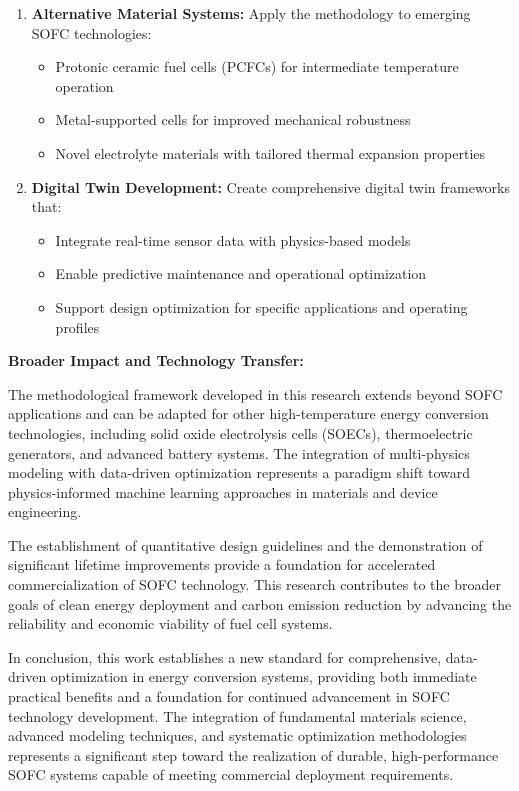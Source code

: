 \documentclass[conference]{IEEEtran}
\begin{document}
\begin{enumerate}
\item \textbf{Alternative Material Systems:} Apply the methodology to emerging SOFC technologies:
   \begin{itemize}
   \item Protonic ceramic fuel cells (PCFCs) for intermediate temperature operation
   \item Metal-supported cells for improved mechanical robustness
   \item Novel electrolyte materials with tailored thermal expansion properties
   \end{itemize}

\item \textbf{Digital Twin Development:} Create comprehensive digital twin frameworks that:
   \begin{itemize}
   \item Integrate real-time sensor data with physics-based models
   \item Enable predictive maintenance and operational optimization
   \item Support design optimization for specific applications and operating profiles
   \end{itemize}
\end{enumerate}

\textbf{Broader Impact and Technology Transfer:}

The methodological framework developed in this research extends beyond SOFC applications and can be adapted for other high-temperature energy conversion technologies, including solid oxide electrolysis cells (SOECs), thermoelectric generators, and advanced battery systems. The integration of multi-physics modeling with data-driven optimization represents a paradigm shift toward physics-informed machine learning approaches in materials and device engineering.

The establishment of quantitative design guidelines and the demonstration of significant lifetime improvements provide a foundation for accelerated commercialization of SOFC technology. This research contributes to the broader goals of clean energy deployment and carbon emission reduction by advancing the reliability and economic viability of fuel cell systems.

In conclusion, this work establishes a new standard for comprehensive, data-driven optimization in energy conversion systems, providing both immediate practical benefits and a foundation for continued advancement in SOFC technology development. The integration of fundamental materials science, advanced modeling techniques, and systematic optimization methodologies represents a significant step toward the realization of durable, high-performance SOFC systems capable of meeting commercial deployment requirements.
\end{document}
